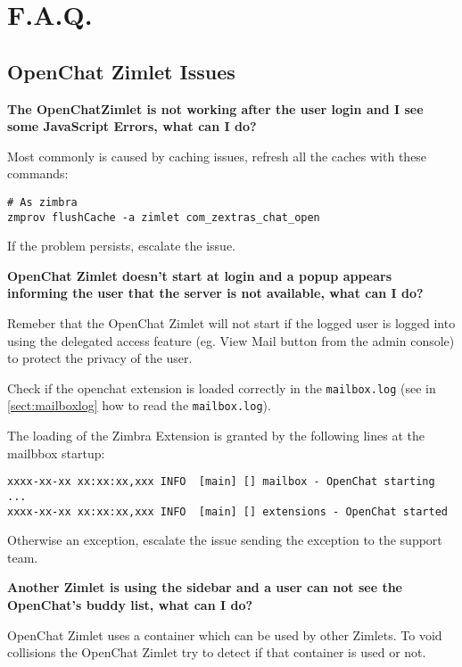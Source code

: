 \section{F.A.Q.}
\label{sect:faq}

    \subsection[Zimlet Issues]{OpenChat Zimlet Issues}

    \textbf{The OpenChatZimlet is not working after the user login and I see some JavaScript Errors, what can I do?}

        Most commonly is caused by caching issues, refresh all the caches with these commands:
        \begin{verbatim}
# As zimbra
zmprov flushCache -a zimlet com_zextras_chat_open
        \end{verbatim}
        If the problem persists, escalate the issue.

    \textbf{OpenChat Zimlet doesn’t start at login and a popup appears informing the user that the server is not
    available, what can I do?}

        \begin{info}
            Remeber that the OpenChat Zimlet will not start if the logged user is logged into using the delegated access
            feature (eg. View Mail button from the admin console) to protect the privacy of the user.
        \end{info}

        Check if the openchat extension is loaded correctly in the \verb+mailbox.log+ (see in \autoref{sect:mailboxlog}
        how to read the \verb+mailbox.log+).

        The loading of the Zimbra Extension is granted by the following lines at the mailbbox startup:
        \begin{verbatim}
xxxx-xx-xx xx:xx:xx,xxx INFO  [main] [] mailbox - OpenChat starting ...
xxxx-xx-xx xx:xx:xx,xxx INFO  [main] [] extensions - OpenChat started
        \end{verbatim}
        Otherwise an exception, escalate the issue sending the exception to the support team.

    \textbf{Another Zimlet is using the sidebar and a user can not see the OpenChat's buddy list, what can I do?}

        OpenChat Zimlet uses a container which can be used by other Zimlets. To void collisions the OpenChat Zimlet try
        to detect if that container is used or not.

